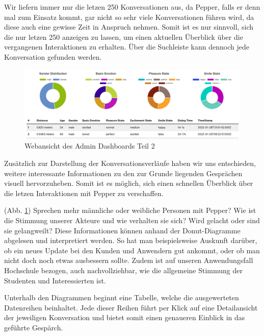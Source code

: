 Wir liefern immer nur die letzen 250 Konversationen aus, da Pepper, falls er denn
mal zum Einsatz kommt, gar nicht so sehr viele Konversationen führen wird, da diese auch eine gewisse Zeit in Anspruch nehmen.
Somit ist es nur sinnvoll, sich die nur letzen 250 anzeigen zu lassen, um einen aktuellen Überblick über die vergangenen
Interaktionen zu erhalten. Über die Suchleiste kann dennoch jede Konversation gefunden werden.\\


\begin{figure}[H]
    \includegraphics[width=\textwidth]{Figures/NodeChapter/adminDashboard2.png}
    \caption{Webansicht des Admin Dashboards Teil 2}
    \label{fig:admindashboard2}
    \centering
\end{figure}

Zusätzlich zur Darstellung der Konversationsverläufe haben wir uns entschieden, weitere interessante Informationen zu den zur Grunde
liegenden Gesprächen visuell hervorzuheben. Somit ist es möglich, sich einen schnellen Überblick
über die letzen Interaktionen mit Pepper zu verschaffen.

(Abb. \ref{fig:admindashboard2}) Sprechen mehr männliche oder weibliche Personen
mit Pepper? Wie ist die Stimmung unserer Akteure und wie verhalten sie sich? Wird gelacht oder sind sie gelangweilt? Diese Informationen
können anhand der Donut-Diagramme abgelesen und interpretiert werden. So hat man beispielsweise Auskunft darüber, ob ein neues
Update bei den Kunden und Anwendern gut ankommt, oder ob man nicht doch noch etwas ausbessern sollte. Zudem ist auf unseren
Anwendungsfall Hochschule bezogen, auch nachvollziehbar, wie die allgemeine Stimmung der Studenten und Interessierten ist.

Unterhalb den Diagrammen beginnt eine Tabelle, welche die ausgewerteten Datenreihen beinhaltet. Jede dieser Reihen
führt per Klick auf eine Detailansicht der jeweiligen Konversation und bietet somit einen genaueren Einblick in das geführte
Gespärch.

